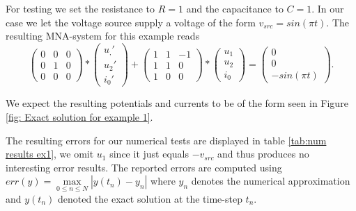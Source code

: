 \begin{example1}
	For testing we set the resistance to $R=1$ and the capacitance to $C=1$. In our case we let the  voltage source supply a voltage of the form $v_{src} = sin(\pi t)$. The resulting MNA-system for this example reads
	\begin{equation}
		\label{eq:MNA-system of chargin capacitor with explicit values}
		\begin{pmatrix}
			0 & 0 & 0 \\
			0 & 1 & 0 \\
			0 & 0 & 0
		\end{pmatrix}
		*
		\begin{pmatrix}
			u_,' \\
			u_2' \\
			i_0'
		\end{pmatrix}
		+
		\begin{pmatrix}
			1 & 1 & -1 \\
			1 & 1 & 0 \\
			1 & 0 & 0 
		\end{pmatrix}
		*
		\begin{pmatrix}
			u_1 \\
			u_2 \\
			i_0
		\end{pmatrix}
		=
		\begin{pmatrix}
			0 \\
			0 \\
			-sin(\pi t)
		\end{pmatrix}.
	\end{equation}
		
	We expect the resulting potentials and currents to be of the form seen in Figure \ref{fig: Exact solution for example 1}.

	The resulting errors for our numerical tests are displayed in table \ref{tab:num results ex1}, we omit $u_1$ since it just equals $-v_{src}$ and thus produces no interesting error results. The reported errors are computed using $err(y) = \max\limits_{0 \leq n \leq N} | y(t_n) - y_n |$ where $y_n$ denotes the numerical approximation and $y(t_n)$ denoted the exact solution at the time-step $t_n$. 
	

\end{example1}
